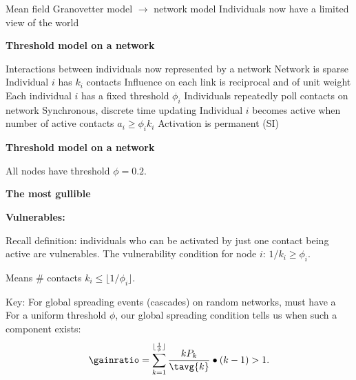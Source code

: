   
   Mean field Granovetter model $\rightarrow$ network model
   Individuals now have a limited view of the world
  


  \textbf{Threshold model on a network}

  
   Interactions between individuals 
    now represented by a network
   Network is \alert{sparse}
   Individual $i$ has $k_i$ contacts
   Influence on each link is \alert{reciprocal} and of \alert{unit weight}
   Each individual $i$ has a fixed threshold $\phi_i$
   Individuals repeatedly poll contacts on network
   Synchronous, discrete time updating 
   Individual $i$ becomes active when\\
    number of active contacts $a_i \ge \phi_i k_i$
   Activation is permanent (SI)
  




  \textbf{Threshold model on a network}

      
    \setlength\fboxsep{0pt}
    \setlength\fboxrule{0.5pt}
    
    \setlength\fboxsep{0pt}
    \setlength\fboxrule{0.5pt}
    
    \setlength\fboxsep{0pt}
    \setlength\fboxrule{0.5pt}
  
  
   All nodes have threshold $\phi=0.2$.
  





  \textbf{The most gullible}

  \textbf{Vulnerables:}
    
     Recall definition: individuals who can be activated by
    just one contact being active are \alert{vulnerables}.
     The vulnerability condition for node $i$:
      $1/k_i \ge \phi_i$.
    
      Means \# contacts  $k_{i} \le \lfloor 1/\phi_i \rfloor$.
    
      \alert{Key:} For global spreading events (cascades) on random networks, must have a
      \cite{watts2002a}
     For a uniform threshold $\phi$, our global spreading condition
      tells us when such a component exists:
      $$
      \gainratio
      =
      \sum_{k=1}^{{\lfloor \frac{1}{\phi} \rfloor}}
      \frac{kP_k}{\tavg{k}} 
      \bullet
      (k-1)
      > 1.
      $$
    
